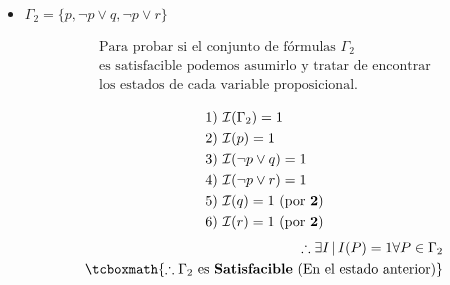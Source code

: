 \documentclass[11pt,letterpaper]{article}
\begin{document}
\begin{enumerate}
\begin{itemize}
            \clearpage
            \item $\Gamma_2 = \{p, \neg p \lor q, \neg p \lor r\}$

                \begin{equation*} \begin{split}
                    \text{Para probar si el conjunto de fórmulas } \Gamma_2 \\
                    \text{es satisfacible podemos asumirlo y tratar de encontrar} \\
                    \text{los estados de cada variable proposicional.} \\
                \end{split} \end{equation*}
                \begin{equation*} \begin{split} \begin{aligned}
                    \text{1) }&\mathcal{I}(\Gamma_2) = 1 \\
                    \text{2) }&\mathcal{I}(p) = 1 \\
                    \text{3) }&\mathcal{I}(\neg p \lor q) = 1 \\
                    \text{4) }&\mathcal{I}(\neg p \lor r) = 1 \\
                    \text{5) }&\mathcal{I}(q) = 1 \text{ (por \textbf{2})}\\
                    \text{6) }&\mathcal{I}(r) = 1 \text{ (por \textbf{2})}\\
                \end{aligned} \end{split} \end{equation*}
                \begin{equation*} \begin{split}
                    \therefore \exists I \, | \, I(P) = 1 \forall P \in \Gamma_2 \\
                    \tcboxmath{\therefore \Gamma_2 \text{ es \textbf{Satisfacible} (En el estado anterior)}}
                \end{split} \end{equation*}
        \end{itemize}
\end{enumerate}
\end{document}

